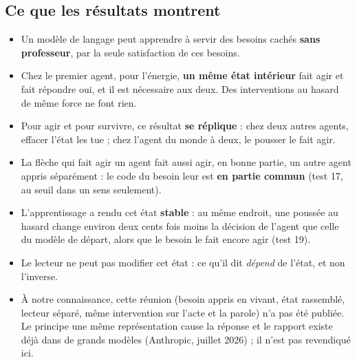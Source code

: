 \documentclass[fontsize=10pt,paper=a4,parskip=half-]{scrartcl}
\newcommand{\q}[1]{\og #1\fg{}}
\begin{document}
\subsection{Ce que les résultats montrent}
\begin{itemize}
  \item Un modèle de langage peut apprendre à servir des besoins cachés \textbf{sans
  professeur}, par la seule satisfaction de ces besoins.
  \item Chez le premier agent, pour l'énergie, \textbf{un même état intérieur} fait agir et
  fait répondre \q{oui}, et il est nécessaire aux deux. Des interventions au hasard de même
  force ne font rien.
  \item Pour agir et pour survivre, ce résultat \textbf{se réplique} : chez deux autres
  agents, effacer l'état les tue ; chez l'agent du monde à deux, le pousser le fait agir.
  \item La flèche qui fait agir un agent fait aussi agir, en bonne partie, un autre agent
  appris séparément : le code du besoin leur est \textbf{en partie commun} (test 17, au
  seuil dans un sens seulement).
  \item L'apprentissage a rendu cet état \textbf{stable} : au même endroit, une poussée au
  hasard change environ deux cents fois moins la décision de l'agent que celle du modèle de
  départ, alors que le besoin le fait encore agir (test 19).
  \item Le lecteur ne peut pas modifier cet état : ce qu'il dit \emph{dépend} de l'état, et
  non l'inverse.
  \item À notre connaissance, cette réunion (besoin appris en vivant, état rassemblé,
  lecteur séparé, même intervention sur l'acte et la parole) n'a pas été publiée. Le
  principe \q{une même représentation cause la réponse et le rapport} existe déjà dans de
  grands modèles (Anthropic, juillet 2026) ; il n'est pas revendiqué ici.
\end{itemize}
\end{document}
